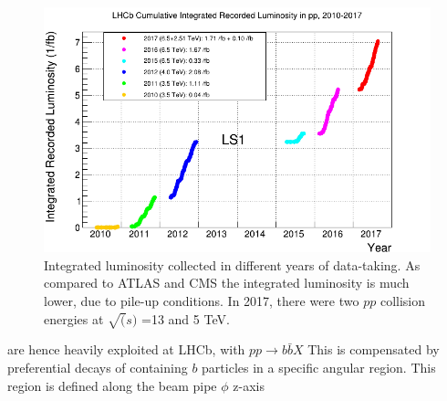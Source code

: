 \begin{figure}
	\centering
	\includegraphics[scale = 0.5]{figs/detector/intlumi.png}
	\caption{Integrated luminosity collected in different years of data-taking. As compared to ATLAS and CMS the integrated luminosity is much lower, due to pile-up conditions. In 2017, there were two $pp$ collision energies at $\sqrt(s)$ =13 and 5 TeV.}
	\label{fig:lhcbintlumi}
\end{figure}


are hence heavily exploited at LHCb, with $pp\rightarrow b\bar{b}X$ This is compensated by preferential decays of containing $b$ particles in a specific angular region.  This region is defined along the beam pipe $\phi$ z-axis
